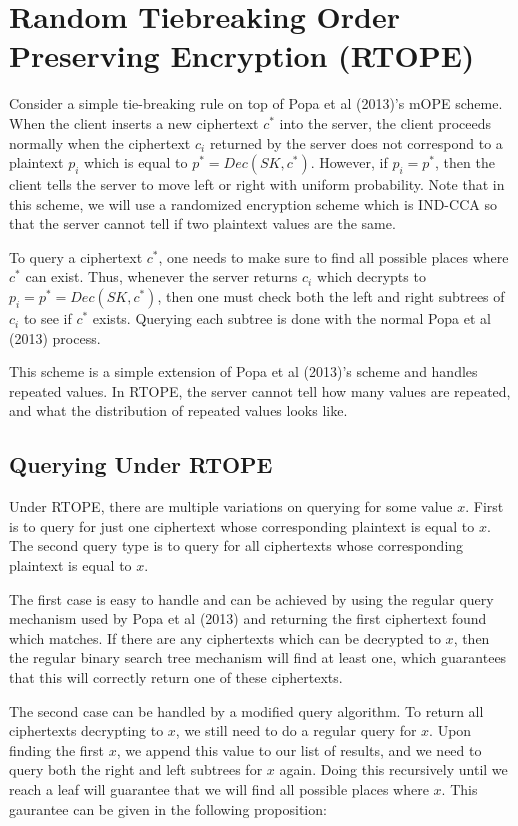 \documentclass[12pt]{article}
\begin{document}
\section{Random Tiebreaking Order Preserving Encryption (RTOPE)}

  Consider a simple tie-breaking rule on top of Popa et al (2013)'s mOPE scheme. When the client inserts a new ciphertext $c^*$ into the server, the client proceeds normally when the ciphertext $c_i$ returned by the server does not correspond to a plaintext $p_i$ which is equal to $p^* = Dec(SK, c^*)$. However, if $p_i = p^*$, then the client tells the server to move left or right with uniform probability. Note that in this scheme, we will use a randomized encryption scheme which is IND-CCA so that the server cannot tell if two plaintext values are the same.

  To query a ciphertext $c^*$, one needs to make sure to find all possible places where $c^*$ can exist. Thus, whenever the server returns $c_i$ which decrypts to $p_i = p^* = Dec(SK, c^*)$, then one must check both the left and right subtrees of $c_i$ to see if $c^*$ exists. Querying each subtree is done with the  normal Popa et al (2013) process.

  This scheme is a simple extension of Popa et al (2013)'s scheme and handles repeated values. In RTOPE, the server cannot tell how many values are repeated, and what the distribution of repeated values looks like.

  \subsection{Querying Under RTOPE}

  Under RTOPE, there are multiple variations on querying for some value $x$. First is to query for just one ciphertext whose corresponding plaintext is equal to $x$. The second query type is to query for all ciphertexts whose corresponding plaintext is equal to $x$. 

  The first case is easy to handle and can be achieved by using the regular query mechanism used by Popa et al (2013) and returning the first ciphertext found which matches. If there are any ciphertexts which can be decrypted to $x$, then the regular binary search tree mechanism will find at least one, which guarantees that this will correctly return one of these ciphertexts.

  The second case can be handled by a modified query algorithm. To return all ciphertexts decrypting to $x$, we still need to do a regular query for $x$. Upon finding the first $x$, we append this value to our list of results, and we need to query both the right and left subtrees for $x$ again. Doing this recursively until we reach a leaf will guarantee that we will find all possible places where $x$. This gaurantee can be given in the following proposition:
\end{document}
